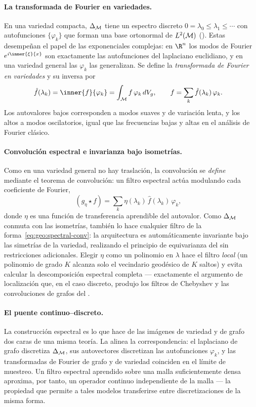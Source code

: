 \paragraph{La transformada de Fourier en variedades.}
En una variedad compacta, $\Delta_{\mathcal{M}}$ tiene un espectro discreto
$0 = \lambda_0 \le \lambda_1 \le \cdots$ con autofunciones $\{\varphi_k\}$ que
forman una base ortonormal de $L^2(\mathcal{M})$ (). Estas
desempe\~nan el papel de las exponenciales complejas: en $\R^n$ los modos de
Fourier $e^{i\inner{\xi}{x}}$ son exactamente las autofunciones del laplaciano
euclidiano, y en una variedad general las $\varphi_k$ las generalizan. Se define
la \emph{transformada de Fourier en variedades} y su inversa por
\[
  \hat f(\lambda_k) = \inner{f}{\varphi_k} = \int_\M f\, \varphi_k\, dV_g,
  \qquad
  f = \sum_{k} \hat f(\lambda_k)\, \varphi_k .
\]
Los autovalores bajos corresponden a modos suaves y de variaci\'on lenta, y los
altos a modos oscilatorios, igual que las frecuencias bajas y altas en el
an\'alisis de Fourier cl\'asico.

\paragraph{Convoluci\'on espectral e invarianza bajo isometr\'ias.}
Como en una variedad general no hay traslaci\'on, la convoluci\'on se
\emph{define} mediante el teorema de convoluci\'on: un filtro espectral act\'ua
modulando cada coeficiente de Fourier,
\begin{equation}
\label{eq:geo:spectral-conv}
  (g_\eta \star f) = \sum_k \eta(\lambda_k)\, \hat f(\lambda_k)\, \varphi_k,
\end{equation}
donde $\eta$ es una funci\'on de transferencia aprendible del autovalor. Como
$\Delta_{\mathcal{M}}$ conmuta con las isometr\'ias, tambi\'en lo hace cualquier filtro de
la forma~\eqref{eq:geo:spectral-conv}: la arquitectura es autom\'aticamente
invariante bajo las simetr\'ias de la variedad, realizando el principio de
equivarianza del  sin restricciones adicionales. Elegir $\eta$
como un polinomio en $\lambda$ hace el filtro \emph{local} (un polinomio de grado
$K$ alcanza solo el vecindario geod\'esico de $K$ saltos) y evita calcular la
descomposici\'on espectral completa --- exactamente el argumento de
localizaci\'on que, en el caso discreto, produjo los filtros de Chebyshev y las
convoluciones de grafos del .

\paragraph{El puente continuo--discreto.}
La construcci\'on espectral es lo que hace de las im\'agenes de variedad y de
grafo dos caras de una misma teor\'ia. La  alinea la
correspondencia: el laplaciano de grafo discretiza $\Delta_{\mathcal{M}}$, sus
autovectores discretizan las autofunciones $\varphi_k$, y las transformadas de
Fourier de grafo y de variedad coinciden en el l\'imite de muestreo. Un filtro
espectral aprendido sobre una malla suficientemente densa aproxima, por tanto, un
operador continuo independiente de la malla --- la propiedad que permite a tales
modelos transferirse entre discretizaciones de la misma forma.

